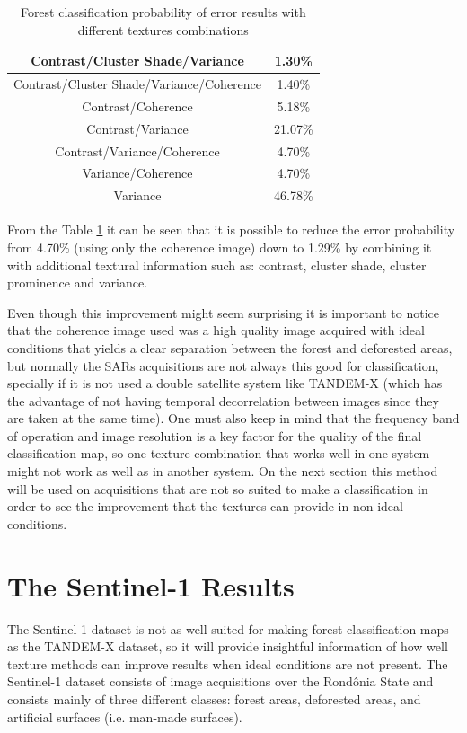 \begin{table}[H]
\begin{tabular}{ |c |c |}
        Contrast/Cluster Shade/Variance & 1.30\% \\ \hline
        Contrast/Cluster Shade/Variance/Coherence & 1.40\% \\ \hline
        Contrast/Coherence & 5.18\% \\ \hline
        Contrast/Variance & 21.07\% \\ \hline
        Contrast/Variance/Coherence & 4.70\% \\ \hline
        Variance/Coherence & 4.70\% \\ \hline
        Variance & 46.78\% \\ \hline
    \end{tabular}
    \caption{Forest classification probability of error results with different textures combinations}
    \label{tab:tandemx_results}
\end{table}

From the Table \ref{tab:tandemx_results} it can be seen that it is possible to reduce the error probability from 4.70\% (using only the coherence image) down to 1.29\% by combining it with additional textural information such as: contrast, cluster shade, cluster prominence and variance.

Even though this improvement might seem surprising it is important to notice that the
coherence image used was a high quality image acquired with ideal conditions that yields a clear separation between the forest and deforested areas,
but normally the SARs acquisitions are not always this good for classification, specially if
it is not used a double satellite system like TANDEM-X (which has the advantage of not
having temporal decorrelation between images since they are taken at the same time). One must also keep in mind that the frequency band of operation and image resolution is a key factor for the quality of the final classification map, so one texture combination that works well in one system might not work as well as in another system.
On
the next section this method will be used on acquisitions that are not so suited to make a
classification in order to see the improvement that the textures can provide in non-ideal
conditions.

\section{The Sentinel-1 Results}
The Sentinel-1 dataset is not as well suited for making forest classification maps as the TANDEM-X dataset, so it will provide insightful information of how well texture methods can improve results when ideal conditions are not present. The Sentinel-1 dataset consists of image acquisitions over the Rondônia State and consists mainly of three different classes: forest areas, deforested areas, and artificial surfaces (i.e. man-made surfaces). 

